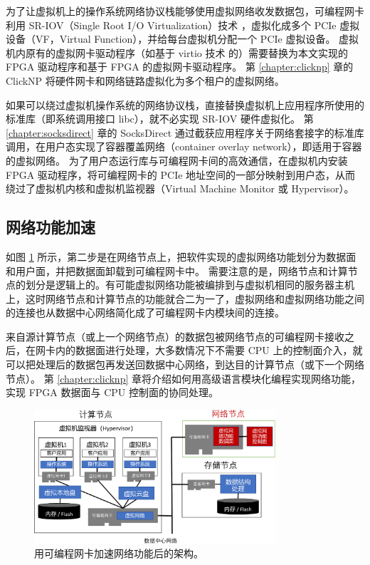 为了让虚拟机上的操作系统网络协议栈能够使用虚拟网络收发数据包，可编程网卡利用 SR-IOV（Single Root I/O Virtualization）技术 \cite{dong2012high}，虚拟化成多个 PCIe 虚拟设备（VF，Virtual Function），并给每台虚拟机分配一个 PCIe 虚拟设备。
虚拟机内原有的虚拟网卡驱动程序（如基于 virtio 技术 \cite{russell2008virtio} 的）需要替换为本文实现的 FPGA 驱动程序和基于 FPGA 的虚拟网卡驱动程序。
第 \ref{chapter:clicknp} 章的 ClickNP 将硬件网卡和网络链路虚拟化为多个租户的虚拟网络。

如果可以绕过虚拟机操作系统的网络协议栈，直接替换虚拟机上应用程序所使用的标准库（即系统调用接口 libc），就不必实现 SR-IOV 硬件虚拟化。
第 \ref{chapter:socksdirect} 章的 SocksDirect 通过截获应用程序关于网络套接字的标准库调用，在用户态实现了容器覆盖网络（container overlay network），即适用于容器的虚拟网络。
为了用户态运行库与可编程网卡间的高效通信，在虚拟机内安装 FPGA 驱动程序，将可编程网卡的 PCIe 地址空间的一部分映射到用户态，从而绕过了虚拟机内核和虚拟机监视器（Virtual Machine Monitor 或 Hypervisor）。



\subsection{网络功能加速}

如图 \ref{arch:fig:network-function} 所示，第二步是在网络节点上，把软件实现的虚拟网络功能划分为数据面和用户面，并把数据面卸载到可编程网卡中。
需要注意的是，网络节点和计算节点的划分是逻辑上的。有可能虚拟网络功能被编排到与虚拟机相同的服务器主机上，这时网络节点和计算节点的功能就合二为一了，虚拟网络和虚拟网络功能之间的连接也从数据中心网络简化成了可编程网卡内模块间的连接。

来自源计算节点（或上一个网络节点）的数据包被网络节点的可编程网卡接收之后，在网卡内的数据面进行处理，大多数情况下不需要 CPU 上的控制面介入，就可以把处理后的数据包再发送回数据中心网络，到达目的计算节点（或下一个网络节点）。
第 \ref{chapter:clicknp} 章将介绍如何用高级语言模块化编程实现网络功能，实现 FPGA 数据面与 CPU 控制面的协同处理。


\begin{figure}[htbp]
	\centering
	\includegraphics[width=0.8\textwidth]{figures/NFV_accel.pdf}
	\caption{用可编程网卡加速网络功能后的架构。}
	\label{arch:fig:network-function}
\end{figure}


